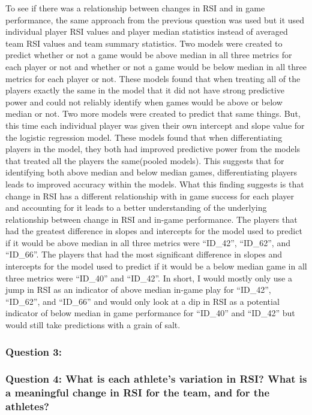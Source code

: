 \documentclass[
]{article}
\begin{document}
To see if there was a relationship between changes in RSI and in game
performance, the same approach from the previous question was used but
it used individual player RSI values and player median statistics
instead of averaged team RSI values and team summary statistics. Two
models were created to predict whether or not a game would be above
median in all three metrics for each player or not and whether or not a
game would be below median in all three metrics for each player or not.
These models found that when treating all of the players exactly the
same in the model that it did not have strong predictive power and could
not reliably identify when games would be above or below median or not.
Two more models were created to predict that same things. But, this time
each individual player was given their own intercept and slope value for
the logistic regression model. These models found that when
differentiating players in the model, they both had improved predictive
power from the models that treated all the players the same(pooled
models). This suggests that for identifying both above median and below
median games, differentiating players leads to improved accuracy within
the models. What this finding suggests is that change in RSI has a
different relationship with in game success for each player and
accounting for it leads to a better understanding of the underlying
relationship between change in RSI and in-game performance. The players
that had the greatest difference in slopes and intercepts for the model
used to predict if it would be above median in all three metrics were
``ID\_42'', ``ID\_62'', and ``ID\_66''. The players that had the most
significant difference in slopes and intercepts for the model used to
predict if it would be a below median game in all three metrics were
``ID\_40'' and ``ID\_42''. In short, I would mostly only use a jump in
RSI as an indicator of above median in-game play for ``ID\_42'',
``ID\_62'', and ``ID\_66'' and would only look at a dip in RSI as a
potential indicator of below median in game performance for ``ID\_40''
and ``ID\_42'' but would still take predictions with a grain of salt.

\subsubsection{Question 3:}\label{question-3}

\subsubsection{Question 4: What is each athlete's variation in RSI? What
is a meaningful change in RSI for the team, and for the
athletes?}\label{question-4-what-is-each-athletes-variation-in-rsi-what-is-a-meaningful-change-in-rsi-for-the-team-and-for-the-athletes-1}
\end{document}
